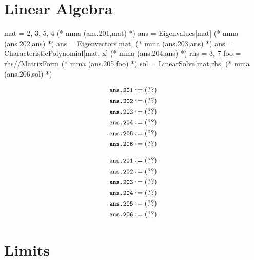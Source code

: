 \documentclass[12pt]{mmalatex}
\begin{document}
\clearpage

\section*{Linear Algebra}

\begin{minipage}[t]{0.65\textwidth}
\begin{mathematica}
   mat = {{2, 3}, {5, 4}}                     (* mma (ans.201,mat) *)
   ans = Eigenvalues[mat]                     (* mma (ans.202,ans) *)
   ans = Eigenvectors[mat]                    (* mma (ans.203,ans) *)
   ans = CharacteristicPolynomial[mat, x]     (* mma (ans.204,ans) *)
   rhs = {3, 7}
   foo = rhs//MatrixForm                      (* mma (ans.205,foo) *)
   sol = LinearSolve[mat,rhs]                 (* mma (ans.206,sol) *)
\end{mathematica}
\end{minipage}
\hskip 1cm
\begin{minipage}[t]{0.35\textwidth}
\begin{latex}
   \begin{align*}
      &\mma*{ans.201}\\
      &\mma*{ans.202}\\
      &\mma*{ans.203}\\
      &\mma*{ans.204}\\
      &\mma*{ans.205}\\
      &\mma*{ans.206}
   \end{align*}
\end{latex}
\end{minipage}

\begin{align*}
   &\mma*{ans.201}\\
   &\mma*{ans.202}\\
   &\mma*{ans.203}\\
   &\mma*{ans.204}\\
   &\mma*{ans.205}\\
   &\mma*{ans.206}
\end{align*}

\clearpage

\section*{Limits}

\vspace{-5pt}
\end{document}

